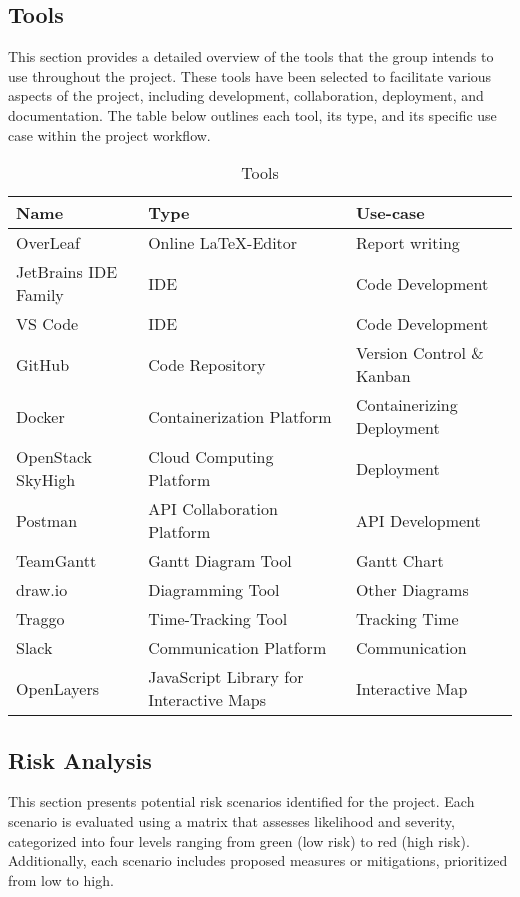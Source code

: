 \subsection{Tools}\label{sec:tools}
This section provides a detailed overview of the tools that the group intends to use throughout the project. These tools have been selected to facilitate various aspects of the project, including development, collaboration, deployment, and documentation. The table below outlines each tool, its type, and its specific use case within the project workflow.
\begin{table} [H]
    \centering
    \begin{tabular}{|l|l|l|}
    \hline
    \textbf{Name} & \textbf{Type} & \textbf{Use-case} \\
    \hline
    OverLeaf & Online \LaTeX-Editor & Report writing \\
    JetBrains IDE Family & IDE & Code Development \\
    VS Code & IDE & Code Development \\
    GitHub \cite{github_org} & Code Repository & Version Control \& Kanban \\
    Docker & Containerization Platform & Containerizing Deployment \\
    OpenStack SkyHigh & Cloud Computing Platform & Deployment \\
    Postman & API Collaboration Platform & API Development \\
    TeamGantt & Gantt Diagram Tool & Gantt Chart \\
    draw.io & Diagramming Tool & Other Diagrams \\
    Traggo & Time-Tracking Tool & Tracking Time \\
    Slack & Communication Platform & Communication \\
    OpenLayers & JavaScript Library for Interactive Maps & Interactive Map  \\
    \hline
    \end{tabular}
    \caption{Tools}
    \label{tab:tools}
\end{table}

\subsection{Risk Analysis}\label{sec:risk_analysis}

This section presents potential risk scenarios identified for the project. Each scenario is evaluated using a matrix that assesses likelihood and severity, categorized into four levels ranging from green (low risk) to red (high risk). Additionally, each scenario includes proposed measures or mitigations, prioritized from low to high.

